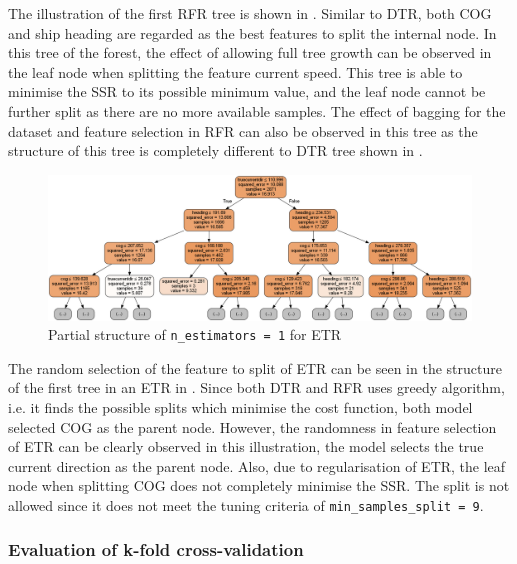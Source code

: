 The illustration of the first RFR tree is shown in . Similar to DTR, both COG and ship heading are regarded as the best features to split the internal node. In this tree of the forest, the effect of allowing full tree growth can be observed in the leaf node when splitting the feature current speed. This tree is able to minimise the SSR to its possible minimum value, and the leaf node cannot be further split as there are no more available samples. The effect of bagging for the dataset and feature selection in RFR can also be observed in this tree as the structure of this tree is completely different to DTR tree shown in .\\

\begin{figure}[h]
    \centering
        \includegraphics[width=.9\textwidth]{02_figures/etr_mod_it1.png}
        \caption{Partial structure of {\tt n\_estimators = 1} for ETR}
        \label{fig:etr_tree1_etr}
\end{figure}
The random selection of the feature to split of ETR can be seen in the structure of the first tree in an ETR in . Since both DTR and RFR uses greedy algorithm, i.e. it finds the possible splits which minimise the cost function, both model selected COG as the parent node. However, the randomness in feature selection of ETR can be clearly observed in this illustration, the model selects the true current direction as the parent node. Also, due to regularisation of ETR, the leaf node when splitting COG does not completely minimise the SSR. The split is not allowed since it does not meet the tuning criteria of {\tt min\_samples\_split = 9}.\\ 

\subsubsection{Evaluation of k-fold cross-validation}\label{sec:bbm_kfold_perf_eval}

